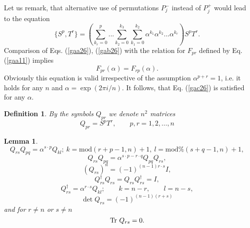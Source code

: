 \documentclass[a4paper,a4paper]{article}
\newtheorem{definition}[theorem]{Definition}
\newtheorem{lemma}[theorem]{Lemma}
\begin{document}
Let us remark, that alternative use of permutations $P_{j}^{-}$ instead of $%
P_{j}^{+}$ would lead to the equation 
\begin{equation}
\{S^{p},T^{r}\}=\left(
\sum_{k_{r}=0}^{p}...\sum_{k_{2}=0}^{k_{3}}\sum_{k_{1}=0}^{k_{2}}\alpha
^{k_{1}}\alpha ^{k_{2}}...\alpha ^{k_{r}}\right) S^{p}T^{r}.  \label{gab26}
\end{equation}%
Comparison of Eqs. (\ref{gaa26}), (\ref{gab26}) with the relation for $F_{pr}
$ defined by Eq. (\ref{gaa11}) implies 
\begin{equation}
F_{pr}(\alpha )=F_{rp}(\alpha ).  \label{gac26}
\end{equation}%
Obviously this equation is valid irrespective of the assumption $\alpha
^{p+r}=1$, i.e. it holds for any $n$ and $\alpha =\exp (2\pi i/n)$. It
follows, that Eq. (\ref{gac26}) is satisfied for any $\alpha $.

\begin{definition}
\label{def9}By the symbols $Q_{pr}$ we denote $n^{2}$ matrices 
\begin{equation}
Q_{pr}=S^{p}T^{r},\qquad p,r=1,2,...,n  \label{ga27}
\end{equation}
\end{definition}

\begin{lemma}
\begin{equation}  \label{gaa27}
Q_{rs}Q_{pq}=\alpha ^{s\cdot p}Q_{kl};\ k=\text{mod}(r+p-1,n)+1,\ l=\text{mod%
}(s+q-1,n)+1,
\end{equation}
\begin{equation}  \label{ga28}
Q_{rs}Q_{pq}=\alpha ^{s\cdot p-r\cdot q}Q_{pq}Q_{rs},
\end{equation}
\begin{equation}  \label{ga29}
\left( Q_{rs}\right) ^n=(-1)^{(n-1)r\cdot s}I,
\end{equation}
\begin{equation}  \label{ga30}
Q_{rs}^{\dagger }Q_{rs}=Q_{rs}Q_{rs}^{\dagger }=I,
\end{equation}
\begin{equation}  \label{gaa30}
Q_{rs}^{\dagger }=\alpha ^{r\cdot s}Q_{kl};\qquad k=n-r,\qquad l=n-s,
\end{equation}
\begin{equation}  \label{ga31}
\det Q_{rs}=(-1)^{(n-1)(r+s)}
\end{equation}
and for $r\neq n$ or $s\neq n$ 
\begin{equation}  \label{ga32}
\text{\textrm{Tr }}Q_{rs}=0.
\end{equation}
\end{lemma}
\end{document}
